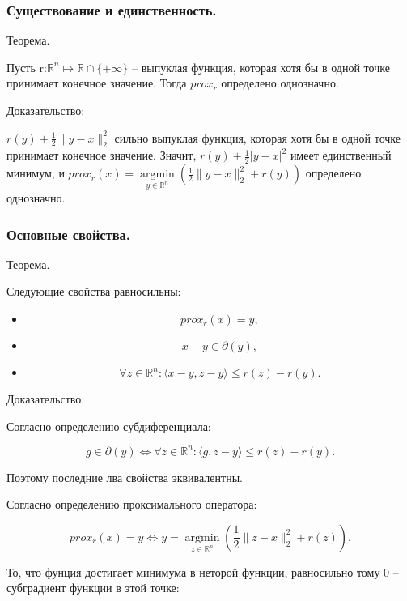 \subsubsection*{Существование и единственность.}

Теорема.

Пусть r:$\mathbb{R}^n\mapsto \mathbb{R}\cap\{+\infty\}$ -- выпуклая функция, которая хотя бы в одной точке принимает конечное значение.
Тогда $prox_r$ определено однозначно.

Доказательство:

$r(y)+\frac12\|y-x\|_2^2$ сильно выпуклая функция, которая хотя бы в одной точке принимает конечное значение. Значит, $r(y)+\frac12|y-x|^2$ имеет единственный минимум, и $prox_r(x)=\mathop{argmin}\limits_{y\in\mathbb{R}^n}\left(\frac12\|y-x\|_2^2+r(y)\right)$ определено однозначно.

\subsubsection*{Основные свойства.}

Теорема.

Следующие свойства равносильны:

\begin{itemize}
\item\[prox_r(x)=y,\]
\item\[x-y\in\partial(y),\]
\item\[\forall z\in\mathbb{R}^n:\langle x-y,z-y\rangle\leq r(z)-r(y).\]
\end{itemize}

Доказательство.

Согласно определению субдиференциала:

\begin{equation}
    g\in\partial(y)\iff\forall z\in\mathbb{R}^n:\langle g,z-y\rangle\leq r(z)-r(y).
\end{equation}

Поэтому последние лва свойства эквивалентны.

Согласно определению проксимального оператора:

\begin{equation}
    prox_r(x)=y\iff y=\mathop{argmin}\limits_{z\in\mathbb{R}^n}\left(\frac12\|z-x\|_2^2+r(z)\right).
\end{equation}

То, что фунция достигает минимума в неторой функции, равносильно тому 0 -- субградиент функции в этой точке:

